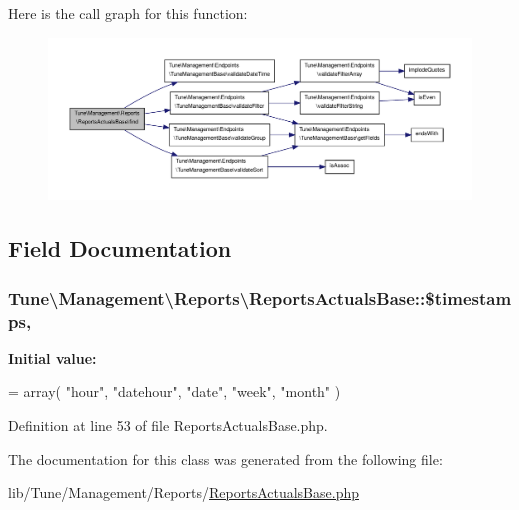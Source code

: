 Here is the call graph for this function\-:
\nopagebreak
\begin{figure}[H]
\begin{center}
\leavevmode
\includegraphics[width=350pt]{classTune_1_1Management_1_1Reports_1_1ReportsActualsBase_ace658fea56b4819168acdc7dc2a2fc84_cgraph}
\end{center}
\end{figure}




\subsection{Field Documentation}
\hypertarget{classTune_1_1Management_1_1Reports_1_1ReportsActualsBase_a88e430144127cf06384eaaac59111bfc}{
\subsubsection[{\$timestamps}]{\setlength{\rightskip}{0pt plus 5cm}Tune\textbackslash{}\-Management\textbackslash{}\-Reports\textbackslash{}\-Reports\-Actuals\-Base\-::\$timestamps\hspace{0.3cm}{\ttfamily [static]}, {\ttfamily [protected]}}}\label{classTune_1_1Management_1_1Reports_1_1ReportsActualsBase_a88e430144127cf06384eaaac59111bfc}
{\bfseries Initial value\-:}
\begin{DoxyCode}
= array(
            \textcolor{stringliteral}{"hour"},
            \textcolor{stringliteral}{"datehour"},
            \textcolor{stringliteral}{"date"},
            \textcolor{stringliteral}{"week"},
            \textcolor{stringliteral}{"month"}
        )
\end{DoxyCode}


Definition at line 53 of file Reports\-Actuals\-Base.\-php.



The documentation for this class was generated from the following file\-:\begin{DoxyCompactItemize}
\item 
lib/\-Tune/\-Management/\-Reports/\hyperlink{ReportsActualsBase_8php}{Reports\-Actuals\-Base.\-php}\end{DoxyCompactItemize}
